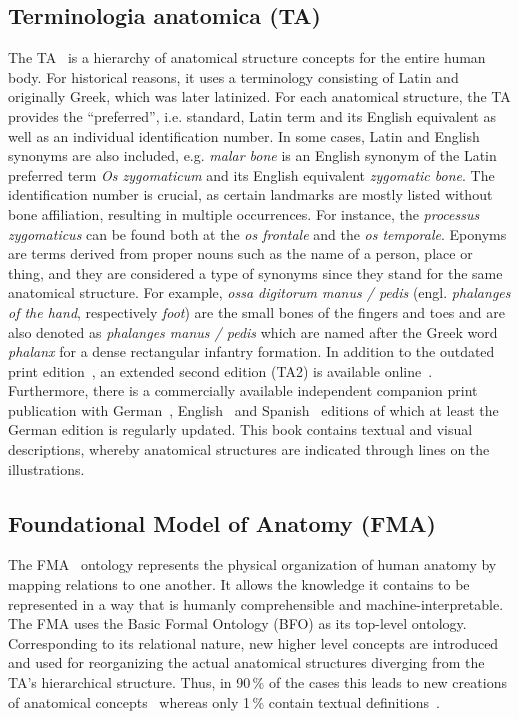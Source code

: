 \documentclass[sw]{iosart2x}
\begin{document}
\subsection{Terminologia anatomica (TA)}\label{sec:ta}
The TA~\citep{ta2} is a hierarchy of anatomical structure concepts for the entire human body.
For historical reasons, it uses a terminology consisting of Latin and originally Greek, which was later latinized.
For each anatomical structure, the TA provides the \enquote{preferred}, i.e. standard, Latin term and its English equivalent as well as an individual identification number.
In some cases, Latin and English synonyms are also included, e.g. \emph{malar bone} is an English synonym of the Latin preferred term \emph{Os zygomaticum} and its English equivalent \emph{zygomatic bone}.
The identification number is crucial, as certain landmarks are mostly listed without bone affiliation, resulting in multiple occurrences. %
For instance, the \emph{processus zygomaticus} can be found both at the \emph{os frontale} and the \emph{os temporale}.
Eponyms are terms derived from proper nouns such as the name of a person, place or thing, and they are considered a type of synonyms since they stand for the same anatomical structure.
For example, \emph{ossa digitorum manus / pedis} (engl. \emph{phalanges of the hand}, respectively \emph{foot}) are the small bones of the fingers and toes and are also denoted as \emph{phalanges manus / pedis} which are named after the Greek word \emph{phalanx} for a dense rectangular infantry formation.
In addition to the outdated print edition~\citep{ta1998}, an extended second edition (TA2) is available online~\citep{ta2}.
Furthermore, there is a commercially available independent companion print publication with German~\citep{anatomylexicon}, English~\citep{pocketatlas} and Spanish~\citep{taspanish} editions of which at least the German edition is regularly updated.
This book contains textual and visual descriptions, whereby anatomical structures are indicated through lines on the illustrations.

\subsection{Foundational Model of Anatomy (FMA)}\label{sec:fma}
The FMA~\citep{fma} ontology represents the physical organization of human anatomy by mapping relations to one another.
It allows the knowledge it contains to be represented in a way that is humanly comprehensible and machine-interpretable.
The FMA uses the Basic Formal Ontology (BFO) as its top-level ontology.
Corresponding to its relational nature, new higher level concepts are introduced and used for reorganizing the actual anatomical structures diverging from the TA's hierarchical structure.
Thus, in 90\,\% of the cases this leads to new creations of anatomical concepts~\citep{anatomicalterms} whereas only 1\,\% contain textual definitions~\citep{uberon}.
\end{document}
